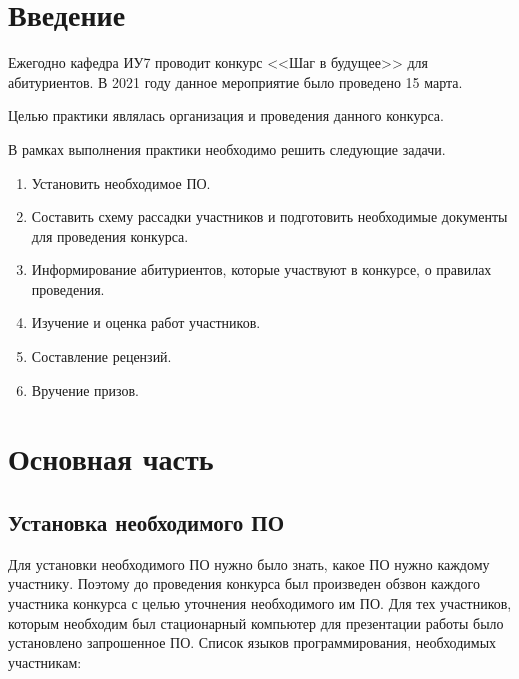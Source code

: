 \documentclass[12pt]{report}
\begin{document}


\tableofcontents

\chapter*{Введение}

Ежегодно кафедра ИУ7 проводит конкурс <<Шаг в будущее>> для абитуриентов.
В 2021 году данное мероприятие было проведено 15 марта. 

Целью практики являлась организация и проведения данного конкурса.

В рамках выполнения практики необходимо решить следующие задачи.

\begin{enumerate}
	\item Установить необходимое ПО.
	\item Составить схему рассадки участников и подготовить необходимые документы для проведения конкурса.
	\item Информирование абитуриентов, которые участвуют в конкурсе, о правилах проведения. 
	\item Изучение и оценка работ участников.
	\item Составление рецензий.
	\item Вручение призов.
\end{enumerate}

\chapter{Основная часть}

\section{Установка необходимого ПО}

Для установки необходимого ПО нужно было знать, какое ПО нужно каждому участнику.
Поэтому до проведения конкурса был произведен обзвон каждого участника конкурса с целью 
уточнения необходимого им ПО. Для тех участников, которым необходим был стационарный компьютер
для презентации работы было установлено запрошенное ПО.
Список языков программирования, необходимых участникам:
\end{document}
